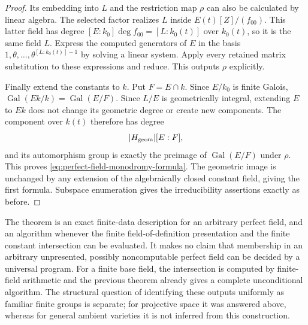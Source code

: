 \begin{proof}
Its embedding into $L$ and the restriction map
$\rho$ can also be calculated by linear algebra.
The selected factor realizes $L$ inside
$E(t)[Z]/(f_{00})$.
This latter field has degree
$[E:k_0]\deg f_{00}=[L:k_0(t)]$ over $k_0(t)$,
so it is the same field $L$.
Express the computed generators of $E$ in the
basis $1,\theta,\ldots,\theta^{[L:k_0(t)]-1}$
by solving a linear system.  Apply every retained
matrix substitution to these expressions and
reduce.  This outputs $\rho$ explicitly.

Finally extend the constants to $k$.
Put $F=E\cap k$.  Since $E/k_0$ is finite Galois,
$\operatorname{Gal}(Ek/k)=\operatorname{Gal}(E/F)$.
Since $L/E$ is geometrically integral, extending
$E$ to $Ek$ does not change its geometric degree
or create new components.  The component over
$k(t)$ therefore has degree
\[
 |H_{\rm geom}|[E:F],
\]
and its automorphism group is exactly the preimage
of $\operatorname{Gal}(E/F)$ under $\rho$.
This proves \eqref{eq:perfect-field-monodromy-formula}.
The geometric image is unchanged by any extension
of the algebraically closed constant field, giving
the first formula.  Subspace enumeration gives the
irreducibility assertions exactly as before.
\end{proof}

\begin{remark}\label{rem:perfect-field-data-scope}
The theorem is an exact finite-data description for
an arbitrary perfect field, and an algorithm whenever
the finite field-of-definition presentation and the
finite constant intersection can be evaluated.
It makes no claim that membership in an arbitrary
unpresented, possibly noncomputable perfect field
can be decided by a universal program.
For a finite base field, the intersection is computed
by finite-field arithmetic and the previous theorem
already gives a complete unconditional algorithm.
The structural question of identifying these outputs
uniformly as familiar finite groups is separate;
for projective space it was answered above, whereas
for general ambient varieties it is not inferred
from this construction.
\end{remark}
